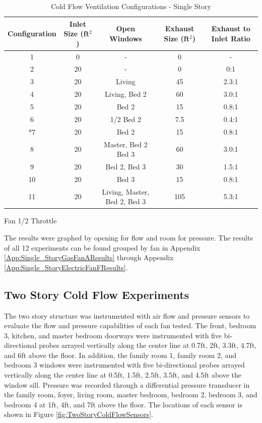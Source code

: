 \documentclass{article}
\begin{document}
\begin{table} [H]
	\caption{Cold Flow Ventilation Configurations - Single Story}
	\begin{tabular}{|c|c|c|c|c|}
		\hline
		Configuration & Inlet Size (ft$^2$) & Open Windows & Exhaust Size (ft$^2$) & Exhaust to Inlet Ratio \\ \hline \hline
		1 & 0 & - & 0 & - \\ \hline
		2 & 20 & - & 0 & 0:1 \\ \hline
		3 & 20 & Living & 45 & 2.3:1 \\ \hline
		4 & 20 & Living, Bed 2 & 60 & 3.0:1 \\ \hline
		5 & 20 & Bed 2 & 15 & 0.8:1 \\ \hline
		6 & 20 & 1/2 Bed 2 & 7.5 & 0.4:1 \\ \hline
		*7 & 20 & Bed 2 & 15 & 0.8:1 \\ \hline
		8 & 20 & Master, Bed 2 Bed 3 & 60 & 3.0:1 \\ \hline
		9 & 20 & Bed 2, Bed 3 & 30 & 1.5:1 \\ \hline
		10 & 20 & Bed 3 & 15 & 0.8:1 \\ \hline
		11 & 20 & Living, Master, Bed 2, Bed 3 & 105 & 5.3:1 \\ \hline
	\end{tabular}
	\begin{tablenotes}
		\item *Fan 1/2 Throttle
	\end{tablenotes}
	\label{tab:ColdFlowConfig_SingleStory}
\end{table}


The results were graphed by opening for flow and room for pressure. The results of all 12 experiments can be found grouped by fan in Appendix \ref{App:Single_StoryGasFanAResults} through Appendix \ref{App:Single_StoryElectricFanFResults}. 

\subsection{Two Story Cold Flow Experiments}
The two story structure was instrumented with air flow and pressure sensors to evaluate the flow and pressure capabilities of each fan tested. The front, bedroom 3, kitchen, and master bedroom doorways were instrumented with five bi-directional probes arrayed vertically along the center line at 0.7ft, 2ft, 3.3ft, 4.7ft, and 6ft above the floor. In addition, the family room 1, family room 2, and bedroom 3 windows were instrumented with five bi-directional probes arrayed vertically along the center line at 0.5ft, 1.5ft, 2.5ft, 3.5ft, and 4.5ft above the window sill. Pressure was recorded through a differential pressure transducer in the family room, foyer, living room, master bedroom, bedroom 2, bedroom 3, and bedroom 4 at 1ft, 4ft, and 7ft above the floor. The locations of each sensor is shown in Figure \ref{fig:TwoStoryColdFlowSensors}. 
\end{document}
